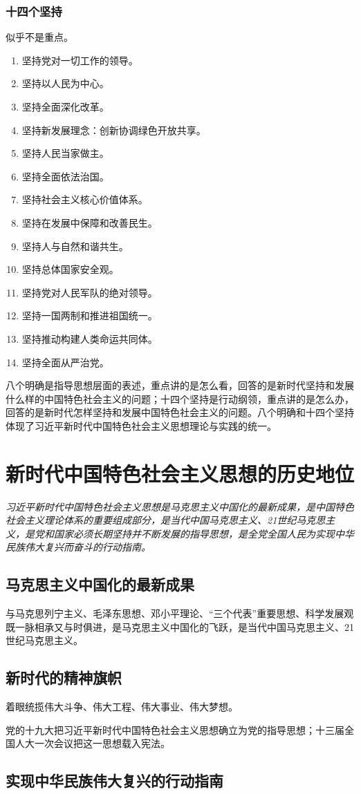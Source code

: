         \subsubsection{十四个坚持}
        似乎不是重点。
        \begin{enumerate}
            \item 坚持党对一切工作的领导。
            \item 坚持以人民为中心。
            \item 坚持全面深化改革。
            \item 坚持新发展理念：创新协调绿色开放共享。
            \item 坚持人民当家做主。
            \item 坚持全面依法治国。
            \item 坚持社会主义核心价值体系。
            \item 坚持在发展中保障和改善民生。
            \item 坚持人与自然和谐共生。
            \item 坚持总体国家安全观。
            \item 坚持党对人民军队的绝对领导。
            \item 坚持一国两制和推进祖国统一。
            \item 坚持推动构建人类命运共同体。
            \item 坚持全面从严治党。
        \end{enumerate}

    八个明确是指导思想层面的表述，重点讲的是怎么看，回答的是新时代坚持和发展什么样的中国特色社会主义的问题；十四个坚持是行动纲领，重点讲的是怎么办，回答的是新时代怎样坚持和发展中国特色社会主义的问题。八个明确和十四个坚持体现了习近平新时代中国特色社会主义思想理论与实践的统一。


\section{新时代中国特色社会主义思想的历史地位}
    \emph{习近平新时代中国特色社会主义思想是马克思主义中国化的最新成果，是中国特色社会主义理论体系的重要组成部分，是当代中国马克思主义、21世纪马克思主义，是党和国家必须长期坚持并不断发展的指导思想，是全党全国人民为实现中华民族伟大复兴而奋斗的行动指南。}
    \subsection{马克思主义中国化的最新成果}
        与马克思列宁主义、毛泽东思想、邓小平理论、“三个代表”重要思想、科学发展观既一脉相承又与时俱进，是马克思主义中国化的飞跃，是当代中国马克思主义、21世纪马克思主义。

    \subsection{新时代的精神旗帜}
        着眼统揽伟大斗争、伟大工程、伟大事业、伟大梦想。

        党的十九大把习近平新时代中国特色社会主义思想确立为党的指导思想；十三届全国人大一次会议把这一思想载入宪法。

    \subsection{实现中华民族伟大复兴的行动指南}
